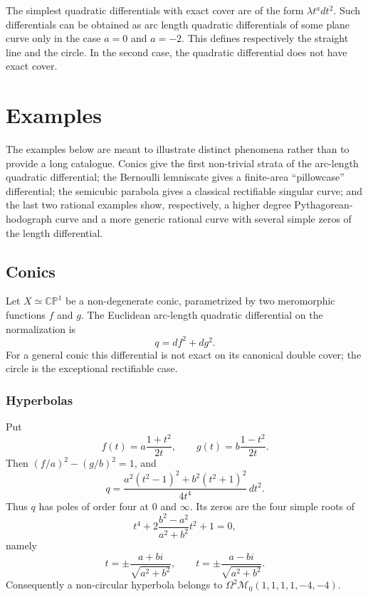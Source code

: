\documentclass[reqno]{amsart}
\theoremstyle{definition}
\theoremstyle{remark}
\theoremstyle{definition}
\theoremstyle{definition}
\theoremstyle{definition}
\begin{document}
The simplest quadratic differentials with exact cover are of the form $\lambda t^{a}dt^{2}$. Such differentials can be obtained as arc length quadratic differentials of some plane curve only in the case $a=0$ and $a=-2$. This defines respectively the straight line and the circle. In the second case, the quadratic differential does not have exact cover.



\section{Examples}\label{sec:examp}

The examples below are meant to illustrate distinct phenomena rather than to
provide a long catalogue.  Conics give the first non-trivial strata of the
arc-length quadratic differential; the Bernoulli lemniscate gives a finite-area
``pillowcase'' differential; the semicubic parabola gives a classical
rectifiable singular curve; and the last two rational examples show,
respectively, a higher degree Pythagorean-hodograph curve and a more generic
rational curve with several simple zeros of the length differential.

\subsection{Conics}

Let $X\simeq\mathbb{CP}^{1}$ be a non-degenerate conic, parametrized by two
meromorphic functions $f$ and $g$.  The Euclidean arc-length quadratic
differential on the normalization is
\[
        q=df^{2}+dg^{2}.
\]
For a general conic this differential is not exact on its canonical double
cover; the circle is the exceptional rectifiable case.

\subsubsection{Hyperbolas}

Put
\[
        f(t)=a\frac{1+t^{2}}{2t},\qquad
        g(t)=b\frac{1-t^{2}}{2t}.
\]
Then $(f/a)^2-(g/b)^2=1$, and
\[
        q=\frac{a^{2}(t^{2}-1)^{2}+b^{2}(t^{2}+1)^{2}}{4t^{4}}\,dt^{2}.
\]
Thus $q$ has poles of order four at $0$ and $\infty$.  Its zeros are the four
simple roots of
\[
        t^{4}+2\frac{b^{2}-a^{2}}{a^{2}+b^{2}}t^{2}+1=0,
\]
namely
\[
        t=\pm\frac{a+bi}{\sqrt{a^{2}+b^{2}}},\qquad
        t=\pm\frac{a-bi}{\sqrt{a^{2}+b^{2}}}.
\]
Consequently a non-circular hyperbola belongs to
$\Omega^{2}\mathcal{M}_{0}(1,1,1,1,-4,-4)$.
\end{document}

